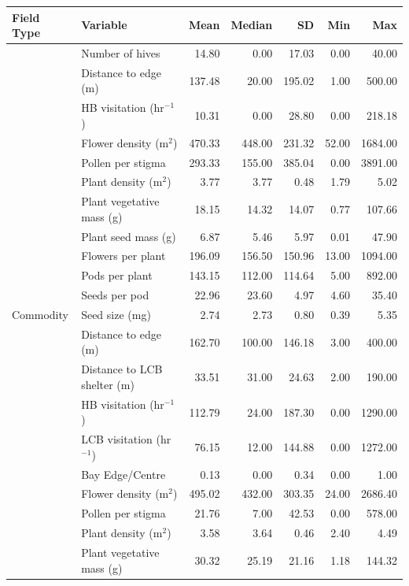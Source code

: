 \begin{table}[ht]
\begin{tabular}{l|l|r|r|r|r|r}
\hline
Field Type & Variable & Mean & Median & SD & Min & Max\\
\hline
 & Number of hives & 14.80 & 0.00 & 17.03 & 0.00 & 40.00\\
\cline{2-7}
 & Distance to edge (m) & 137.48 & 20.00 & 195.02 & 1.00 & 500.00\\
\cline{2-7}
 & HB visitation (hr$^{-1}$) & 10.31 & 0.00 & 28.80 & 0.00 & 218.18\\
\cline{2-7}
 & Flower density (m$^2$) & 470.33 & 448.00 & 231.32 & 52.00 & 1684.00\\
\cline{2-7}
 & Pollen per stigma & 293.33 & 155.00 & 385.04 & 0.00 & 3891.00\\
\cline{2-7}
 & Plant density (m$^2$) & 3.77 & 3.77 & 0.48 & 1.79 & 5.02\\
\cline{2-7}
 & Plant vegetative mass (g) & 18.15 & 14.32 & 14.07 & 0.77 & 107.66\\
\cline{2-7}
 & Plant seed mass (g) & 6.87 & 5.46 & 5.97 & 0.01 & 47.90\\
\cline{2-7}
 & Flowers per plant & 196.09 & 156.50 & 150.96 & 13.00 & 1094.00\\
\cline{2-7}
 & Pods per plant & 143.15 & 112.00 & 114.64 & 5.00 & 892.00\\
\cline{2-7}
 & Seeds per pod & 22.96 & 23.60 & 4.97 & 4.60 & 35.40\\
\cline{2-7}
\multirow{-12}{*}{\raggedright\arraybackslash Commodity} & Seed size (mg) & 2.74 & 2.73 & 0.80 & 0.39 & 5.35\\
\cline{1-7}
 & Distance to edge (m) & 162.70 & 100.00 & 146.18 & 3.00 & 400.00\\
\cline{2-7}
 & Distance to LCB shelter (m) & 33.51 & 31.00 & 24.63 & 2.00 & 190.00\\
\cline{2-7}
 & HB visitation (hr$^{-1}$) & 112.79 & 24.00 & 187.30 & 0.00 & 1290.00\\
\cline{2-7}
 & LCB visitation (hr$^{-1}$) & 76.15 & 12.00 & 144.88 & 0.00 & 1272.00\\
\cline{2-7}
 & Bay Edge/Centre & 0.13 & 0.00 & 0.34 & 0.00 & 1.00\\
\cline{2-7}
 & Flower density (m$^2$) & 495.02 & 432.00 & 303.35 & 24.00 & 2686.40\\
\cline{2-7}
 & Pollen per stigma & 21.76 & 7.00 & 42.53 & 0.00 & 578.00\\
\cline{2-7}
 & Plant density (m$^2$) & 3.58 & 3.64 & 0.46 & 2.40 & 4.49\\
\cline{2-7}
 & Plant vegetative mass (g) & 30.32 & 25.19 & 21.16 & 1.18 & 144.32\\

\end{tabular}
\end{table}
